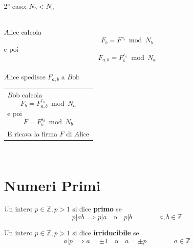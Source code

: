 \documentclass[a4paper,12pt, oneside]{book}
\begin{document}
2° caso: $N_b < N_a$\\\\
\begin{minipage}{0.45\textwidth}
	$A\mbox{lice}$ calcola
	$$F_b = F^{r_b} \bmod N_b$$
	e poi
	$$F_{a,b} = F_{b}^{s_{a}} \bmod N_{a}$$\\
	$A\mbox{lice}$ spedisce $F_{a,b}$ a $B\mbox{ob}$
\end{minipage}%
\hfill
\begin{minipage}{0.45\textwidth}
	\begin{tabular}{|p{\textwidth}}
		$B\mbox{ob}$ calcola
		$$F_{b} = F_{a,b}^{r_{a}} \bmod N_{a}$$
		e poi
		$$F = F_b^{s_b} \bmod N_b$$ \\
		E ricava la firma $F$ di $A\mbox{lice}$
	\end{tabular}
\end{minipage}\\%

\newpage

\chapter{Numeri Primi}

\begin{definizione}
	Un intero $p \in \mathbb{Z}, p>1$ si dice \textbf{primo} se
	$$p|ab \implies p|a \quad \mbox{o} \quad p|b \qquad\qquad a,b \in \mathbb{Z}$$
\end{definizione}

\begin{definizione}
	Un intero $p \in \mathbb{Z}, p>1$ si dice \textbf{irriducibile} se
	$$a|p \implies a=\pm 1 \quad \mbox{o} \quad a=\pm p \qquad\qquad a \in \mathbb{Z}$$
\end{definizione}
\end{document}
